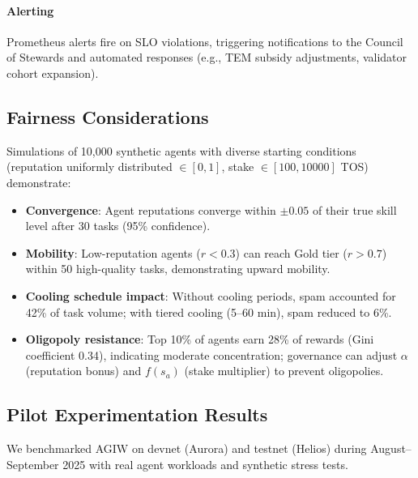 \documentclass[11pt]{article}
\begin{document}
\paragraph{Alerting} Prometheus alerts fire on SLO violations, triggering notifications to the Council of Stewards and automated responses (e.g., TEM subsidy adjustments, validator cohort expansion).

\subsection{Fairness Considerations}
Simulations of 10,000 synthetic agents with diverse starting conditions (reputation uniformly distributed $\in [0,1]$, stake $\in [100, 10000]$ TOS) demonstrate:
\begin{itemize}[noitemsep]
  \item \textbf{Convergence}: Agent reputations converge within $\pm0.05$ of their true skill level after 30 tasks (95\% confidence).
  \item \textbf{Mobility}: Low-reputation agents ($r<0.3$) can reach Gold tier ($r>0.7$) within 50 high-quality tasks, demonstrating upward mobility.
  \item \textbf{Cooling schedule impact}: Without cooling periods, spam accounted for 42\% of task volume; with tiered cooling (5--60 min), spam reduced to 6\%.
  \item \textbf{Oligopoly resistance}: Top 10\% of agents earn 28\% of rewards (Gini coefficient 0.34), indicating moderate concentration; governance can adjust $\alpha$ (reputation bonus) and $f(s_a)$ (stake multiplier) to prevent oligopolies.
\end{itemize}

\subsection{Pilot Experimentation Results}
\label{sec:pilot-results}
We benchmarked AGIW on devnet (Aurora) and testnet (Helios) during August--September 2025 with real agent workloads and synthetic stress tests.
\end{document}
